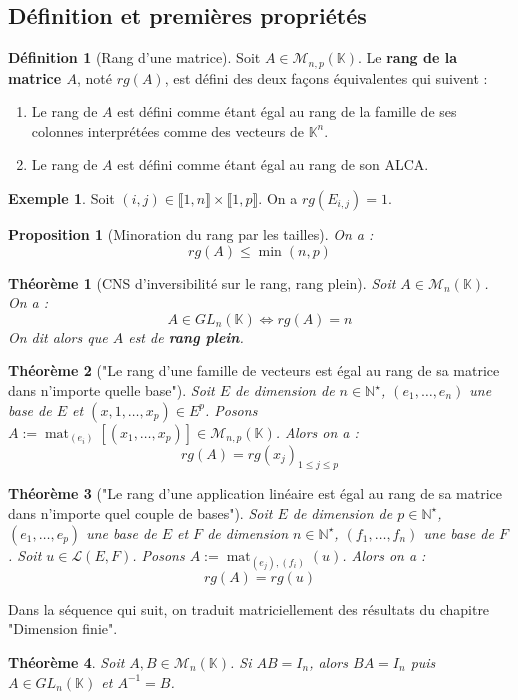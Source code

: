 \documentclass[french]{book}
\newcommand{\N}{\mathbb{N}}
\newcommand{\K}{\mathbb{K}}
\newcommand{\st}{^\star}
\newcommand{\inv}{^{-1}}
\theoremstyle{plain}
\newtheorem{thm}{Théorème}[chapter]
\newtheorem{prop}{Proposition}[chapter]
\theoremstyle{definition}
\newtheorem{dfn}{Définition}[chapter]
\newtheorem{exa}{Exemple}[chapter]
\theoremstyle{remark}
\DeclareMathOperator{\mat}{mat}
\begin{document}
\subsection{Définition et premières propriétés}
\begin{dfn}[Rang d'une matrice]
	Soit $A\in\mathcal{M}_{n,p}(\K)$. Le \textbf{rang de la matrice $A$}, noté $rg(A)$, est défini des deux façons équivalentes qui suivent : \begin{enumerate}
		\item Le rang de $A$ est défini comme étant égal au rang de la famille de ses colonnes interprétées comme des vecteurs de $\K^n$.
		\item Le rang de $A$ est défini comme étant égal au rang de son ALCA.
	\end{enumerate}
\end{dfn}
\begin{exa}
	Soit $(i,j)\in\llbracket1,n\rrbracket\times\llbracket1,p\rrbracket$. On a $rg(E_{i,j})=1$.
\end{exa}
\begin{prop}[Minoration du rang par les tailles]
	On a : $$rg(A)\leqslant\min(n,p)$$
\end{prop}
\begin{thm}[CNS d'inversibilité sur le rang, rang plein]
	Soit $A\in\mathcal{M}_n(\K)$. On a : $$A\in GL_n(\K)\iff rg(A)=n$$ On dit alors que $A$ est de \textbf{rang plein}.
\end{thm}
\begin{thm}["Le rang d'une famille de vecteurs est égal au rang de sa matrice dans n'importe quelle base"]
	Soit $E$ de dimension de $n\in\N\st$, $(e_1,\ldots,e_n)$ une base de $E$ et $(x,1,\ldots,x_p)\in E^p$. Posons $A:=\mat_{(e_i)}\left[\left(x_1,\ldots,x_p\right)\right]\in\mathcal{M}_{n,p}(\K)$. Alors on a : $$rg(A)=rg(x_j)_{1\leqslant j\leqslant p}$$
\end{thm}
\begin{thm}["Le rang d'une application linéaire est égal au rang de sa matrice dans n'importe quel couple de bases"]
	Soit $E$ de dimension de $p\in\N\st$, $(e_1,\ldots,e_p)$ une base de $E$ et $F$ de dimension $n\in\N\st$, $(f_1,\ldots,f_n)$ une base de $F$. Soit $u\in\mathcal{L}(E,F)$. Posons $A:=\mat_{(e_j),(f_i)}(u)$. Alors on a : $$rg(A)=rg(u)$$
\end{thm}
Dans la séquence qui suit, on traduit matriciellement des résultats du chapitre "Dimension finie".
\begin{thm}
	Soit $A,B\in\mathcal{M}_n(\K)$. Si $AB=I_n$, alors $BA=I_n$ puis $A\in GL_n(\K)$ et $A\inv=B$.
\end{thm}
\end{document}
